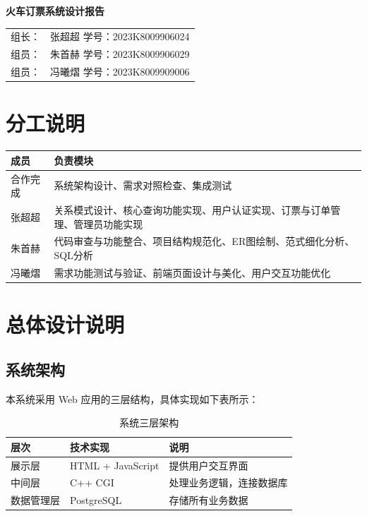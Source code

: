 \documentclass[10pt,a4paper]{article}
\begin{document}
\begin{center}
    {\LARGE\textbf{火车订票系统设计报告}}

    \vspace{1cm}

    \begin{tabular}{rl}
        组长： & 张超超 \quad 学号：2023K8009906024 \\
        组员： & 朱首赫 \quad 学号：2023K8009906029 \\
        组员： & 冯曦熠 \quad 学号：2023K8009909006 
    \end{tabular}
\end{center}

\setcounter{section}{-1}
\section{分工说明}
\begin{table}[H]
    \centering
    \begin{tabular}{ll}
        \toprule
        \textbf{成员} & \textbf{负责模块} \\
        \midrule
        合作完成 & 系统架构设计、需求对照检查、集成测试 \\
        张超超 & 关系模式设计、核心查询功能实现、用户认证实现、订票与订单管理、管理员功能实现 \\
        朱首赫 & 代码审查与功能整合、项目结构规范化、ER图绘制、范式细化分析、SQL分析 \\
        冯曦熠 & 需求功能测试与验证、前端页面设计与美化、用户交互功能优化 \\
        \bottomrule
    \end{tabular}
\end{table}

\section{总体设计说明}

\subsection{系统架构}
本系统采用 Web 应用的三层结构，具体实现如下表所示：

\begin{table}[H]
    \centering
    \caption{系统三层架构}
    \begin{tabular}{lll}
        \toprule
        \textbf{层次} & \textbf{技术实现} & \textbf{说明} \\
        \midrule
        展示层 & HTML + JavaScript & 提供用户交互界面 \\
        中间层 & C++ CGI & 处理业务逻辑，连接数据库 \\
        数据管理层 & PostgreSQL & 存储所有业务数据 \\
        \bottomrule
    \end{tabular}
\end{table}
\end{document}
